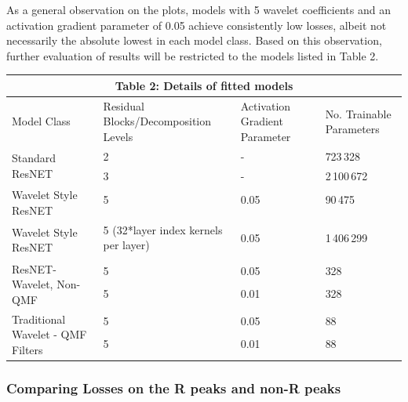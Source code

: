 \documentclass[9pt,conference]{IEEEtran}
\begin{document}
As a general observation on the plots, models with 5 wavelet coefficients and an activation gradient parameter of 0.05 achieve consistently low losses, albeit not necessarily the absolute lowest in each model class. Based on this observation, further evaluation of results will be restricted to the models listed in Table 2.

\begin{center}
    \begin{tabular}{ |p{3cm}||p{3cm}|p{3cm}|p{3cm}|  }
     \hline
     \multicolumn{4}{|c|}{Table 2: Details of fitted models} \\
     \hline
     Model Class& Residual Blocks/Decomposition Levels & Activation Gradient Parameter & No. Trainable Parameters \\
     \hline
        \multirow{2}{4em}{Standard ResNET}  
                                        &   2  & -& 723\,328   \\
                                        & 3 & -& 2\,100\,672\\
      \hline
      \multirow{2}{6em}{Wavelet Style ResNET}  
                                        & 5 & 0.05 & 90\,475 \\
                                        & & & \\
        \hline  
    \multirow{2}{6em}{Wavelet Style ResNET}  
                                        & 5 (32*layer index kernels per layer) & 0.05 & 1\,406\,299 \\
                                         & & & \\
        \hline
     \multirow{3}{7em}{ResNET-Wavelet, Non-QMF}  
                                    & 5 & 0.05 & 328 \\
                                     & 5 & 0.01 & 328 \\ & & & \\
    \hline

    \multirow{3}{6em}{Traditional Wavelet - QMF Filters}  
                                    & 5 & 0.05 & 88 \\
                                     & 5 & 0.01 & 88 \\
                                     & & & \\
    \hline
    \end{tabular}
\end{center}



\subsubsection{Comparing Losses on the R peaks and non-R peaks}
\end{document}
